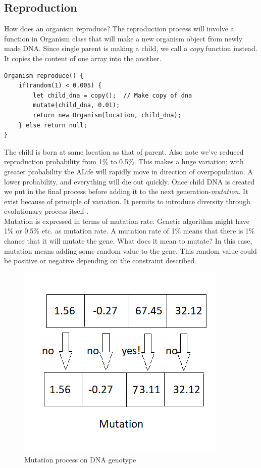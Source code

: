 \documentclass[conference]{IEEEtran}
\begin{document}
\subsection{Reproduction}
How does an organism reproduce? The reproduction process will involve a function in Organism class that will make a new organism object from newly made DNA. Since single parent is making a child, we call a \textit{copy} function instead. It copies the content of one array into the another.
\begin{lstlisting}[caption=Function returning new organism: the child]
Organism reproduce() {
	if(random(1) < 0.005) {
		let child_dna = copy();  // Make copy of dna	
		mutate(child_dna, 0.01);
		return new Organism(location, child_dna);
	} else return null;
}
\end{lstlisting}
The child is born at same location as that of parent. Also note we've reduced reproduction probability from 1\% to 0.5\%. This makes a huge variation; with greater probability the ALife will rapidly move in direction of overpopulation. A lower probability, and everything will die out quickly. Once child DNA is created we put in the final process before adding it to the next generation-\textit{mutation}. It exist because of principle of variation. It permits to introduce diversity through evolutionary process itself \cite{Stanley}.\\
Mutation is expressed in terms of mutation rate. Genetic algorithm might have 1\% or 0.5\% etc. as mutation rate. A mutation rate of 1\% means that there is 1\% chance that it will mutate the gene. What does it mean to mutate? In this case, mutation means adding some random value to the gene. This random value could be positive or negative depending on the constraint described.\\
\begin{figure}
	\includegraphics[scale=1]{mutation.png}
	\caption{Mutation process on DNA genotype}
	\label{fig:mutation}
\end{figure}
\end{document}
